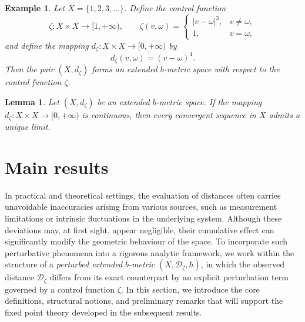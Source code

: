 \documentclass[sn-mathphys-num]{sn-jnl}%
\theoremstyle{thmstyleone}%
\theoremstyle{thmstyletwo}%
\newtheorem{example}{Example}%
\theoremstyle{thmstylethree}%
\newtheorem{lemma}{Lemma}
\numberwithin{equation}{section}
\begin{document}
\begin{example} \cite{Samreen} \label{ex:extended-bmetric}
Let $X=\{1,2,3,\ldots\}$. Define the control function 
\[
\zeta:X\times X\to[1,+\infty), \qquad 
\zeta(v,\omega)=
\begin{cases}
|v-\omega|^{3}, & v\neq \omega,\\[2mm]
1, & v=\omega,
\end{cases}
\]
and define the mapping $d_{\zeta}:X\times X\to[0,+\infty)$ by
\[
d_{\zeta}(v,\omega)=(v-\omega)^{4}.
\]
Then the pair $(X,d_{\zeta})$ forms an extended $b$-metric space with respect to the 
control function $\zeta$.
\end{example}


\vspace{0.2cm}
\begin{lemma}\cite{kamran}
Let $(X,d_{\zeta})$ be an extended $b$-metric space. If the mapping 
$d_{\zeta}:X\times X\to[0,+\infty)$ is continuous, then every convergent sequence 
in $X$ admits a unique limit.
\end{lemma}


\section{Main results}
In practical and theoretical settings, the evaluation of distances often carries 
unavoidable inaccuracies arising from various sources, such as measurement 
limitations or intrinsic fluctuations in the underlying system. Although these 
deviations may, at first sight, appear negligible, their cumulative effect can 
significantly modify the geometric behaviour of the space. To incorporate such 
perturbative phenomena into a rigorous analytic framework, we work within the 
structure of a \emph{perturbed extended $b$-metric} $(X,\mathcal{D}_{\zeta},\hbar)$,  
in which the observed distance $\mathcal{D}_{\zeta}$ differs from its exact 
counterpart by an explicit perturbation term governed by a control function 
$\zeta$. In this section, we introduce the core definitions, structural notions, 
and preliminary remarks that will support the fixed point theory developed in 
the subsequent results.
\end{document}
